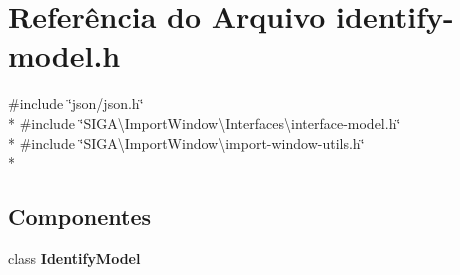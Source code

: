 \section{Referência do Arquivo identify-\/model.h}
\label{identify-model_8h}
{\ttfamily \#include \char`\"{}json/json.\+h\char`\"{}}\\*
{\ttfamily \#include \char`\"{}S\+I\+G\+A\textbackslash{}\+Import\+Window\textbackslash{}\+Interfaces\textbackslash{}interface-\/model.\+h\char`\"{}}\\*
{\ttfamily \#include \char`\"{}S\+I\+G\+A\textbackslash{}\+Import\+Window\textbackslash{}import-\/window-\/utils.\+h\char`\"{}}\\*
\subsection*{Componentes}
\begin{DoxyCompactItemize}
\item 
class {\bf Identify\+Model}
\end{DoxyCompactItemize}
